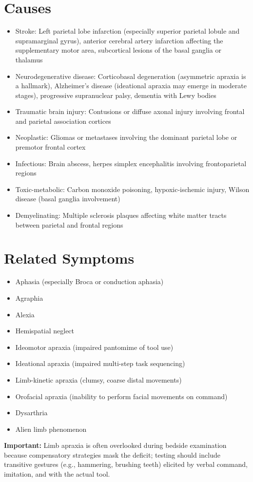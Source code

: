 \section*{Causes}
\begin{itemize}
 \item Stroke: Left parietal lobe infarction (especially superior parietal lobule and supramarginal gyrus), anterior cerebral artery infarction affecting the supplementary motor area, subcortical lesions of the basal ganglia or thalamus
 \item Neurodegenerative disease: Corticobasal degeneration (asymmetric apraxia is a hallmark), Alzheimer's disease (ideational apraxia may emerge in moderate stages), progressive supranuclear palsy, dementia with Lewy bodies
 \item Traumatic brain injury: Contusions or diffuse axonal injury involving frontal and parietal association cortices
 \item Neoplastic: Gliomas or metastases involving the dominant parietal lobe or premotor frontal cortex
 \item Infectious: Brain abscess, herpes simplex encephalitis involving frontoparietal regions
 \item Toxic-metabolic: Carbon monoxide poisoning, hypoxic-ischemic injury, Wilson disease (basal ganglia involvement)
 \item Demyelinating: Multiple sclerosis plaques affecting white matter tracts between parietal and frontal regions
\end{itemize}

\section*{Related Symptoms}
\begin{itemize}
 \item Aphasia (especially Broca or conduction aphasia)
 \item Agraphia
 \item Alexia
 \item Hemispatial neglect
 \item Ideomotor apraxia (impaired pantomime of tool use)
 \item Ideational apraxia (impaired multi-step task sequencing)
 \item Limb-kinetic apraxia (clumsy, coarse distal movements)
 \item Orofacial apraxia (inability to perform facial movements on command)
 \item Dysarthria
 \item Alien limb phenomenon
\end{itemize}
\textbf{Important:} Limb apraxia is often overlooked during bedside examination because compensatory strategies mask the deficit; testing should include transitive gestures (e.g., hammering, brushing teeth) elicited by verbal command, imitation, and with the actual tool.

